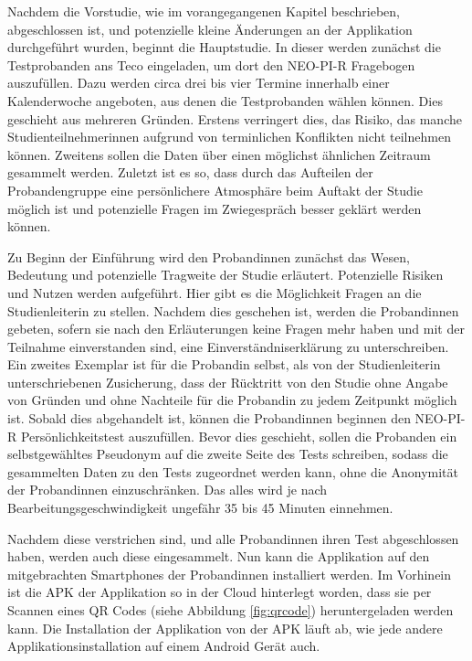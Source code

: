 Nachdem die Vorstudie, wie im vorangegangenen Kapitel beschrieben, abgeschlossen ist, und potenzielle kleine Änderungen an der Applikation durchgeführt wurden, beginnt die Hauptstudie.
In dieser werden zunächst die Testprobanden ans Teco eingeladen, um dort den NEO-PI-R Fragebogen auszufüllen.
Dazu werden circa drei bis vier Termine innerhalb einer Kalenderwoche angeboten, aus denen die Testprobanden wählen können.
Dies geschieht aus mehreren Gründen. 
Erstens verringert dies, das Risiko, das manche Studienteilnehmerinnen aufgrund von terminlichen Konflikten nicht teilnehmen können.
Zweitens sollen die Daten über einen möglichst ähnlichen Zeitraum gesammelt werden.
Zuletzt ist es so, dass durch das Aufteilen der Probandengruppe eine persönlichere Atmosphäre beim Auftakt der Studie möglich ist
und potenzielle Fragen im Zwiegespräch besser geklärt werden können.
\par
Zu Beginn der Einführung wird den Probandinnen zunächst das Wesen, Bedeutung und potenzielle Tragweite der Studie erläutert.
Potenzielle Risiken und Nutzen werden aufgeführt.
Hier gibt es die Möglichkeit Fragen an die Studienleiterin zu stellen.
Nachdem dies geschehen ist, werden die Probandinnen gebeten, sofern sie nach den Erläuterungen keine Fragen mehr haben und mit der Teilnahme einverstanden sind, eine Einverständniserklärung zu unterschreiben.
Ein zweites Exemplar ist für die Probandin selbst, als von der Studienleiterin unterschriebenen Zusicherung, dass der Rücktritt von den Studie ohne Angabe von Gründen und ohne Nachteile für die Probandin zu jedem Zeitpunkt möglich ist.
Sobald dies abgehandelt ist, können die Probandinnen beginnen den NEO-PI-R Persönlichkeitstest auszufüllen.
Bevor dies geschieht, sollen die Probanden ein selbstgewähltes Pseudonym auf die zweite Seite des Tests schreiben, sodass die gesammelten Daten zu den Tests zugeordnet werden kann, ohne die Anonymität der Probandinnen einzuschränken.
Das alles wird je nach Bearbeitungsgeschwindigkeit ungefähr 35 bis 45 Minuten einnehmen.
\par
Nachdem diese verstrichen sind, und alle Probandinnen ihren Test abgeschlossen haben, werden auch diese eingesammelt.
Nun kann die Applikation auf den mitgebrachten Smartphones der Probandinnen installiert werden.
Im Vorhinein ist die APK der Applikation so in der Cloud hinterlegt worden, dass sie per Scannen eines QR Codes (siehe Abbildung \ref{fig:qrcode}) heruntergeladen werden kann.
Die Installation der Applikation von der APK läuft ab, wie jede andere Applikationsinstallation auf einem Android Gerät auch.
